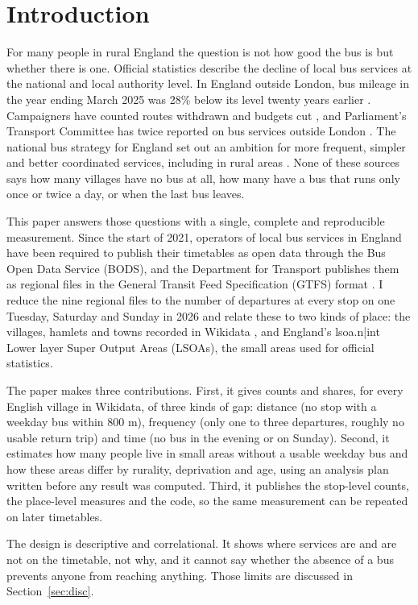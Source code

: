 \documentclass[11pt,a4paper]{article}
\begin{document}
\section{Introduction}\label{sec:intro}
For many people in rural England the question is not how good the bus is but whether there is one. Official statistics describe the decline of local bus services at the national and local authority level. In England outside London, bus mileage in the year ending March 2025 was 28\% below its level twenty years earlier \citep{dft2025}. Campaigners have counted routes withdrawn and budgets cut \citep{cbt2013,cbt2018}, and Parliament's Transport Committee has twice reported on bus services outside London \citep{tc2019,tc2023}. The national bus strategy for England set out an ambition for more frequent, simpler and better coordinated services, including in rural areas \citep{dft2021}. None of these sources says how many villages have no bus at all, how many have a bus that runs only once or twice a day, or when the last bus leaves.

This paper answers those questions with a single, complete and reproducible measurement. Since the start of 2021, operators of local bus services in England have been required to publish their timetables as open data through the Bus Open Data Service (BODS), and the Department for Transport publishes them as regional files in the General Transit Feed Specification (GTFS) format \citep{bods2026}. I reduce the nine regional files to the number of departures at every stop on one Tuesday, Saturday and Sunday in 2026 and relate these to two kinds of place: the villages, hamlets and towns recorded in Wikidata \citep{vrandecic2014}, and England's {{lsoa.n|int}} Lower layer Super Output Areas (LSOAs), the small areas used for official statistics.

The paper makes three contributions. First, it gives counts and shares, for every English village in Wikidata, of three kinds of gap: distance (no stop with a weekday bus within 800 m), frequency (only one to three departures, roughly no usable return trip) and time (no bus in the evening or on Sunday). Second, it estimates how many people live in small areas without a usable weekday bus and how these areas differ by rurality, deprivation and age, using an analysis plan written before any result was computed. Third, it publishes the stop-level counts, the place-level measures and the code, so the same measurement can be repeated on later timetables.

The design is descriptive and correlational. It shows where services are and are not on the timetable, not why, and it cannot say whether the absence of a bus prevents anyone from reaching anything. Those limits are discussed in Section~\ref{sec:disc}.
\end{document}
